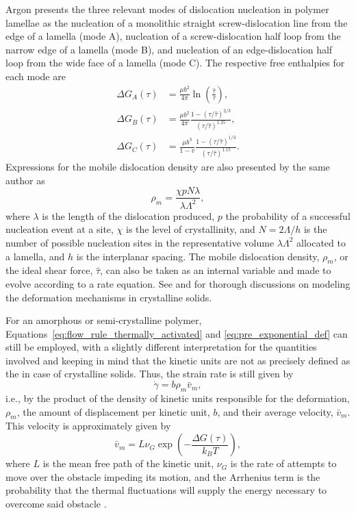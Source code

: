 Argon \citep{argonPhysicsDeformationFracture2013a} presents the three relevant modes of dislocation nucleation in polymer lamellae as the nucleation of a monolithic straight screw-dislocation line from the edge of a lamella (mode A), nucleation of a screw-dislocation half loop from the narrow edge of a lamella (mode B), and nucleation of an edge-dislocation half loop from the wide face of a lamella (mode C).
The respective free enthalpies for each mode are
\begin{align}
	\Delta G_A(\tau)&=\frac{\mu b^2}{4 \pi} \ln\left(\frac{\hat\tau}{\tau}\right),\\
	\Delta G_B(\tau)&=\frac{\mu b^2}{4 \pi} \frac{1-(\tau/\hat\tau)^{2 / 3}}{(\tau/\hat\tau)^{1.25} },\\
	\Delta G_C(\tau)&=\frac{\mu b^3}{1-v} \frac{1-(\tau/\hat\tau)^{1 / 3}}{(\tau/\hat\tau)^{1.15} }.
\end{align}
Expressions for the mobile dislocation density are also presented by the same author as
\begin{equation}
	\rho_m = \frac{\chi p N \lambda}{\lambda \Lambda^2},
\end{equation}
where $\lambda$ is the length of the dislocation produced, $p$ the probability of a successful nucleation event at a site, $\chi$ is the level of crystallinity, and $N = 2\Lambda/h$ is the number of possible nucleation sites in the representative volume $\lambda \Lambda^2$ allocated to a lamella, and $h$ is the interplanar spacing.
The mobile dislocation density, $\rho_m$, or the ideal shear force, $\hat\tau$, can also be taken as an internal variable and made to evolve according to a rate equation.
See \cite{klahn1970strain} and \cite{kocks1975thermodynamics} for thorough discussions on modeling the deformation mechanisms in crystalline solids.

For an amorphous or semi-crystalline polymer,  Equations~\eqref{eq:flow_rule_thermally_activated} and \eqref{eq:pre_exponential_def} can still be employed, with a slightly different interpretation for the quantities involved and keeping in mind that the kinetic units are not as precisely defined as the in case of crystalline solids.
Thus, the strain rate is still given by
\begin{equation}
  \label{eq:plaston_formula}
  \dot \gamma = b \rho_m \bar{v}_m,
\end{equation}
i.e., by the product of the density of kinetic units responsible for the deformation, $\rho_m$, the amount of displacement per kinetic unit, $b$, and their average velocity, $\bar v_m$.
This velocity is approximately given by
\begin{equation}
  \bar v_m = L \nu_G \exp\left(-\frac{\Delta G(\tau)}{k_B T}\right),
\end{equation}
where $L$ is the mean free path of the kinetic unit, $\nu_G$ is the rate of attempts to move over the obstacle impeding its motion, and the Arrhenius term is the probability that the thermal fluctuations will supply the energy necessary to overcome said obstacle \citep{gsellYieldTransientEffects1981, gilmanPLASTICWAVEMYTH1992}.

